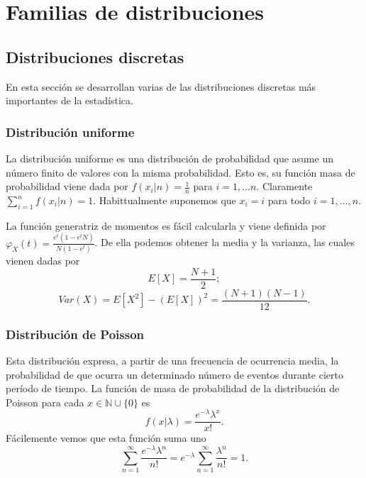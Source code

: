 

\section{Familias de distribuciones}

\subsection{Distribuciones discretas}

    En esta sección se desarrollan varias de las distribuciones discretas más importantes de la estadística.

    \subsubsection{Distribución uniforme}
        La distribución uniforme es una distribución de probabilidad que asume un número finito de valores con la misma probabilidad. Esto es, su función masa de probabilidad viene dada por $f(x_i|n) = \frac{1}{n}$ para $i = 1, \ldots n$. Claramente $\sum^n_{i=1} f(x_i | n) = 1$. Habittualmente suponemos que $x_i = i$ para todo $i = 1, \ldots, n$.

        La función generatriz de momentos es fácil calcularla y viene definida por $\varphi_X(t) = \frac{e^t (1 - e^tN)}{N(1-e^t)}$. De ella podemos obtener la media y la varianza, las cuales vienen dadas por
        \[E[X] = \frac{N+1}{2};\]
        \[Var(X) =  E[X^2] - (E[X])^2 =  \frac{(N+1)(N-1)}{12}.\]

    \subsubsection{Distribución de Poisson}
        Esta distribución expresa, a partir de una frecuencia de ocurrencia media, la probabilidad de que ocurra un determinado número de eventos durante cierto período de tiempo. La función de masa de probabilidad de la distribución de Poisson para cada $x \in \mathbb{N} \cup \{0\}$ es
        \[f(x| \lambda) = \frac{e^{-\lambda}{\lambda}^x}{x!}.\]
        Fácilemente vemos que esta función suma uno
        \[\sum^\infty_{n=1}  \frac{e^{-\lambda}{\lambda}^n}{n!} = e^{-\lambda} \sum^\infty_{n=1}  \frac{{\lambda}^n}{n!}  = 1.\]



